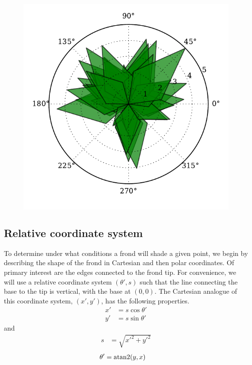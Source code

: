 \begin{figure}[H]
	\centering
	\includegraphics[width=\linewidth]{kelp_sample}
	\vspace{-2em}
	\label{fig:kelp_sample}
\end{figure}

\subsection{Relative coordinate system}
\label{sec:rel_coords}
To determine under what conditions a frond will shade a given point, we begin by describing the shape of the frond in Cartesian and then polar coordinates.
Of primary interest are the edges connected to the frond tip.
For convenience, we will use a relative coordinate system $(\theta',s)$ such that the line connecting the base to the tip is vertical, with the base at $(0,0)$.
The Cartesian analogue of this coordinate system, $(x',y')$, has the following properties.
\begin{align}
	x' &= s\cos\theta' \\ 
	y' &= s\sin\theta'
\end{align}
and
\begin{align}
	s &= \sqrt{x'^2+y'^2}
\end{align}
\vspace{-1em}
\begin{align}
	\theta' &= \operatorname{atan2}(y, x)
\end{align}

